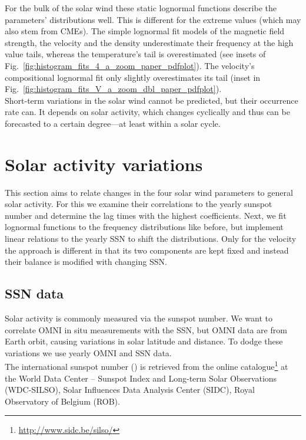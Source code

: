 For the bulk of the solar wind these static lognormal functions describe the parameters' distributions well. This is different for the extreme values (which may also stem from CMEs). The simple lognormal fit models of the magnetic field strength, the velocity and the density underestimate their frequency at the high value tails, whereas the temperature's tail is overestimated (see insets of Fig.~\ref{fig:histogram_fits_4_a_zoom_paper_pdfplot}). The velocity's compositional lognormal fit only slightly overestimates its tail (inset in Fig.~\ref{fig:histogram_fits_V_a_zoom_dbl_paper_pdfplot}).\\

Short-term variations in the solar wind cannot be predicted, but their occurrence rate can. It depends on solar activity, which changes cyclically and thus can be forecasted to a certain degree---at least within a solar cycle.\\


\section{Solar activity variations}
\label{sec:solar_activity_variations}
This section aims to relate changes in the four solar wind parameters to general solar activity. For this we examine their correlations to the yearly sunspot number and determine the lag times with the highest coefficients. Next, we fit lognormal functions to the frequency distributions like before, but implement linear relations to the yearly SSN to shift the distributions. Only for the velocity the approach is different in that its two components are kept fixed and instead their balance is modified with changing SSN.

\subsection{SSN data}
Solar activity is commonly measured via the sunspot number. We want to correlate OMNI in situ measurements with the SSN, but OMNI data are from Earth orbit, causing variations in solar latitude and distance. To dodge these variations we use yearly OMNI and SSN data.\\

The international sunspot number (\citeyear{sidc}) is retrieved from the online catalogue\footnote{\url{http://www.sidc.be/silso/}} at the World Data Center -- Sunspot Index and Long-term Solar Observations (WDC-SILSO), Solar Influences Data Analysis Center (SIDC), Royal Observatory of Belgium (ROB).\\

